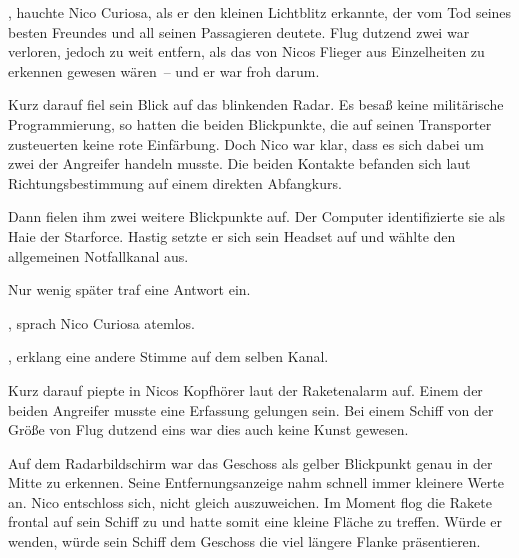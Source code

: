 , hauchte Nico Curiosa, als er den kleinen Lichtblitz erkannte, der vom Tod seines besten Freundes und all seinen Passagieren deutete. Flug dutzend zwei war verloren, jedoch zu weit entfern, als das von Nicos Flieger aus Einzelheiten zu erkennen gewesen wären~-- und er war froh darum.

\par

Kurz darauf fiel sein Blick auf das blinkenden Radar. Es besaß keine militärische Programmierung, so hatten die beiden Blickpunkte, die auf seinen Transporter zusteuerten keine rote Einfärbung. Doch Nico war klar, dass es sich dabei um zwei der Angreifer handeln musste. Die beiden Kontakte befanden sich laut Richtungsbestimmung auf einem direkten Abfangkurs.

\par

Dann fielen ihm zwei weitere Blickpunkte auf. Der Computer identifizierte sie als Haie der Starforce. Hastig setzte er sich sein Headset auf und wählte den allgemeinen Notfallkanal aus. 

\par

Nur wenig später traf eine Antwort ein. 

\par

, sprach Nico Curiosa atemlos. 

\par

, erklang eine andere Stimme auf dem selben Kanal. 

\par

Kurz darauf piepte in Nicos Kopfhörer laut der Raketenalarm auf. Einem der beiden Angreifer musste eine Erfassung gelungen sein. Bei einem Schiff von der Größe von Flug dutzend eins war dies auch keine Kunst gewesen.

\par

Auf dem Radarbildschirm war das Geschoss als gelber Blickpunkt genau in der Mitte zu erkennen. Seine Entfernungsanzeige nahm schnell immer kleinere Werte an. Nico entschloss sich, nicht gleich auszuweichen. Im Moment flog die Rakete frontal auf sein Schiff zu und hatte somit eine kleine Fläche zu treffen. Würde er wenden, würde sein Schiff dem Geschoss die viel längere Flanke präsentieren.

